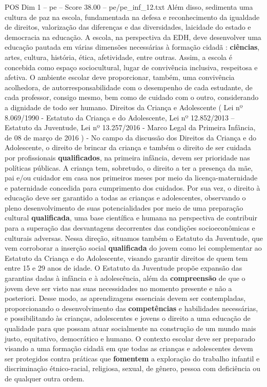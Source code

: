 \begin{textsample}{POS Dim 1 – pe – Score 38.00 – pe/pe\_inf\_12.txt}
Além disso, sedimenta uma cultura de paz na escola, fundamentada na defesa e reconhecimento da igualdade de direitos, valorização das diferenças e das diversidades, laicidade do estado e democracia na educação.
A escola, na perspectiva da EDH, deve desenvolver uma educação pautada em várias dimensões necessárias à formação cidadã : \textbf{ciências}, artes, cultura, história, ética, afetividade, entre outras.
Assim, a escola é concebida como espaço sociocultural, lugar de convivência inclusiva, respeitosa e afetiva.
O ambiente escolar deve proporcionar, também, uma convivência acolhedora, de autorresponsabilidade com o desempenho de cada estudante, de cada professor, consigo mesmo, bem como de cuidado com o outro, considerando a dignidade de todo ser humano.
Direitos da Criança e Adolescente ( Lei nº 8.069/1990 - Estatuto da Criança e do Adolescente, Lei nº 12.852/2013 – Estatuto da Juventude, Lei nº 13.257/2016 - Marco Legal da Primeira Infância, de 08 de março de 2016 ) - No campo da discussão dos Direitos da Criança e do Adolescente, o direito de brincar da criança e também o direito de ser cuidada por profissionais \textbf{qualificados}, na primeira infância, devem ser prioridade nas políticas públicas.
A criança tem, sobretudo, o direito a ter a presença da mãe, pai e/ou cuidador em casa nos primeiros meses por meio da licença-maternidade e paternidade concedida para cumprimento dos cuidados.
Por sua vez, o direito à educação deve ser garantido a todas as crianças e adolescentes, observando o pleno desenvolvimento de suas potencialidades por meio de uma preparação cultural \textbf{qualificada}, uma base científica e humana na perspectiva de contribuir para a superação das desvantagens decorrentes das condições socioeconômicas e culturais adversas.
Nessa direção, situamos também o Estatuto da Juventude, que vem corroborar a inserção social \textbf{qualificada} do jovem como lei complementar ao Estatuto da Criança e do Adolescente, visando garantir direitos de quem tem entre 15 e 29 anos de idade.
O Estatuto da Juventude propõe expansão das garantias dadas à infância e à adolescência, além da \textbf{compreensão} de que o jovem deve ser visto nas suas necessidades no momento presente e não a posteriori.
Desse modo, as aprendizagens essenciais devem ser contempladas, proporcionando o desenvolvimento das \textbf{competências} e habilidades necessárias, e possibilitando às crianças, adolescentes e jovens o direito a uma educação de qualidade para que possam atuar socialmente na construção de um mundo mais justo, equitativo, democrático e humano.
O contexto escolar deve ser preparado visando a uma formação cidadã em que todas as crianças e adolescentes devem ser protegidos contra práticas que \textbf{fomentem} a exploração do trabalho infantil e discriminação étnico-racial, religiosa, sexual, de gênero, pessoa com deficiência ou de qualquer outra ordem.

\end{textsample}
